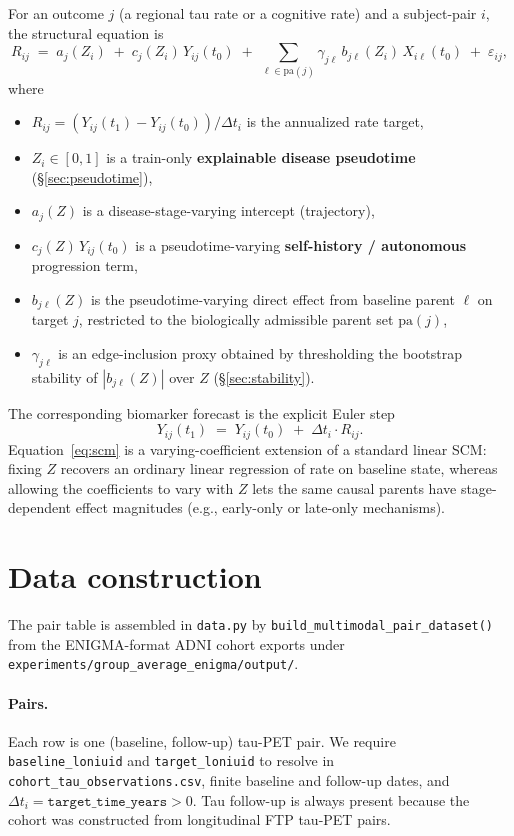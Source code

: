 \documentclass[11pt]{article}
\newcommand{\code}[1]{\texttt{#1}}
\begin{document}
For an outcome $j$ (a regional tau rate or a cognitive rate) and a
subject-pair $i$, the structural equation is
\begin{equation}
R_{ij} \;=\; a_j(Z_i) \;+\; c_j(Z_i)\, Y_{ij}(t_0) \;+\; \sum_{\ell \in \mathrm{pa}(j)} \gamma_{j\ell}\, b_{j\ell}(Z_i)\, X_{i\ell}(t_0) \;+\; \varepsilon_{ij},
\label{eq:scm}
\end{equation}
where
\begin{itemize}[leftmargin=*,nosep]
  \item $R_{ij} = (Y_{ij}(t_1) - Y_{ij}(t_0))/\Delta t_i$ is the annualized rate target,
  \item $Z_i \in [0,1]$ is a train-only \textbf{explainable disease pseudotime} (\S\ref{sec:pseudotime}),
  \item $a_j(Z)$ is a disease-stage-varying intercept (trajectory),
  \item $c_j(Z)\, Y_{ij}(t_0)$ is a pseudotime-varying \textbf{self-history / autonomous} progression term,
  \item $b_{j\ell}(Z)$ is the pseudotime-varying direct effect from baseline parent $\ell$ on target $j$, restricted to the biologically admissible parent set $\mathrm{pa}(j)$,
  \item $\gamma_{j\ell}$ is an edge-inclusion proxy obtained by thresholding the bootstrap stability of $|b_{j\ell}(Z)|$ over $Z$ (\S\ref{sec:stability}).
\end{itemize}
The corresponding biomarker forecast is the explicit Euler step
\begin{equation}
Y_{ij}(t_1) \;=\; Y_{ij}(t_0) \;+\; \Delta t_i \cdot R_{ij}.
\label{eq:forecast}
\end{equation}
Equation~\eqref{eq:scm} is a varying-coefficient extension of a standard
linear SCM: fixing $Z$ recovers an ordinary linear regression of rate on
baseline state, whereas allowing the coefficients to vary with $Z$ lets the
same causal parents have stage-dependent effect magnitudes (e.g.,
early-only or late-only mechanisms).

\section{Data construction}

The pair table is assembled in \code{data.py} by
\code{build\_multimodal\_pair\_dataset()} from the ENIGMA-format ADNI cohort
exports under \code{experiments/group\_average\_enigma/output/}.

\paragraph{Pairs.} Each row is one (baseline, follow-up) tau-PET pair. We
require \code{baseline\_loniuid} and \code{target\_loniuid} to resolve in
\code{cohort\_tau\_observations.csv}, finite baseline and follow-up dates,
and $\Delta t_i = \texttt{target\_time\_years} > 0$. Tau follow-up is always
present because the cohort was constructed from longitudinal FTP tau-PET
pairs.
\end{document}
